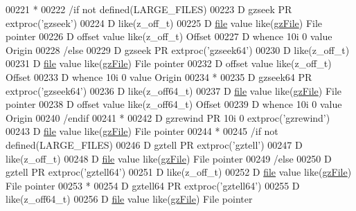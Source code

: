 \begin{DoxyCode}
00221       *
00222       /if not defined(LARGE\_FILES)
00223      D gzseek          PR                  extproc('gzseek')
00224      D                                     like(z\_off\_t)
00225      D  \hyperlink{structfile}{file}                               value like(\hyperlink{structgz_file__s}{gzFile})                   File pointer
00226      D  offset                             value like(z\_off\_t)                  Offset
00227      D  whence                       10i 0 value                                Origin
00228       /else
00229      D gzseek          PR                  extproc('gzseek64')
00230      D                                     like(z\_off\_t)
00231      D  \hyperlink{structfile}{file}                               value like(\hyperlink{structgz_file__s}{gzFile})                   File pointer
00232      D  offset                             value like(z\_off\_t)                  Offset
00233      D  whence                       10i 0 value                                Origin
00234       *
00235      D gzseek64        PR                  extproc('gzseek64')
00236      D                                     like(z\_off64\_t)
00237      D  \hyperlink{structfile}{file}                               value like(\hyperlink{structgz_file__s}{gzFile})                   File pointer
00238      D  offset                             value like(z\_off64\_t)                Offset
00239      D  whence                       10i 0 value                                Origin
00240       /endif
00241       *
00242      D gzrewind        PR            10i 0 extproc('gzrewind')
00243      D  \hyperlink{structfile}{file}                               value like(\hyperlink{structgz_file__s}{gzFile})                   File pointer
00244       *
00245       /if not defined(LARGE\_FILES)
00246      D gztell          PR                  extproc('gztell')
00247      D                                     like(z\_off\_t)
00248      D  \hyperlink{structfile}{file}                               value like(\hyperlink{structgz_file__s}{gzFile})                   File pointer
00249       /else
00250      D gztell          PR                  extproc('gztell64')
00251      D                                     like(z\_off\_t)
00252      D  \hyperlink{structfile}{file}                               value like(\hyperlink{structgz_file__s}{gzFile})                   File pointer
00253       *
00254      D gztell64        PR                  extproc('gztell64')
00255      D                                     like(z\_off64\_t)
00256      D  \hyperlink{structfile}{file}                               value like(\hyperlink{structgz_file__s}{gzFile})                   File pointer

\end{DoxyCode}
